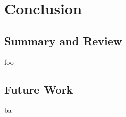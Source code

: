 \chapter{Conclusion}
\label{cha:conclusion}


\section{Summary and Review}
foo

\section{Future Work}
ba
\newpage